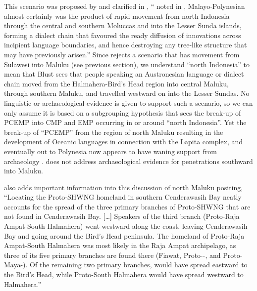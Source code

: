 This scenario was proposed by \citet{Blust1993}
and clarified in \citet[98]{Blust2008},
“ noted in \citet{Blust1993},
 Malayo-Polynesian almost certainly was the product of
rapid movement from north Indonesia through the central
and southern Moluccas and into the Lesser Sunda islands,
forming a dialect chain that favoured the ready diffusion of
innovations across incipient language boundaries,
and hence destroying any tree-like structure that may have previously
arisen.” 
Since \citet{Blust2012b} rejects a scenario that has movement
from Sulawesi into Maluku (see previous section),
we understand “north Indonesia” to mean that Blust sees that
people speaking an Austronesian language or dialect chain moved
from the Halmahera-Bird’s Head region into central Maluku,
through southern Maluku, and travelled westward on into the Lesser Sundas.
No linguistic or archaeological evidence is given to support
such a scenario, so we can only assume it is based on a subgrouping hypothesis
that sees the break-up of PCEMP into CMP
and EMP occurring in or around “north Indonesia”.
Yet the break-up of “PCEMP” from the region of north Maluku resulting
in the development of Oceanic languages in connection with the
Lapita complex, and eventually out to Polynesia now appears to have
waning support from archaeology \citep[4]{Bellwood2019b}.
\citet{Bellwood2019b} does not address archaeological
evidence for penetrations southward into Maluku.

\citet[142]{Kamholz2014} also adds important information into
this discussion of north Maluku positing,
“Locating the Proto-SHWNG homeland in southern Cenderawasih Bay
neatly accounts for the spread of the three primary branches
of Proto-SHWNG that are not found in Cenderawasih Bay.
[{\ldots}] Speakers of the third branch (Proto-Raja Ampat-South Halmahera) went westward
along the coast, leaving Cenderawasih Bay and going around the Bird’s Head peninsula.
The homeland of Proto-Raja Ampat-South Halmahera was most likely in the Raja Ampat
archipelago, as three of its five primary branches are found there
(Fiawat, Proto--, and Proto-Ma{\Q}ya-).
Of the remaining two primary branches,
 would have spread eastward to the Bird’s Head,
while Proto-South Halmahera would have spread westward to Halmahera.”

